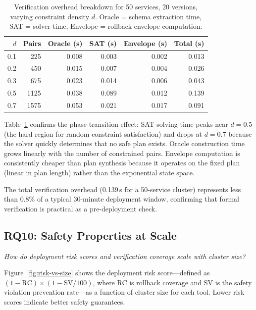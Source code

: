\documentclass[10pt,twocolumn]{article}
\begin{document}
\begin{table}[t]
\centering
\caption{Verification overhead breakdown for 50 services,
  20 versions, varying constraint density $d$.
  Oracle = schema extraction time, SAT = solver time,
  Envelope = rollback envelope computation.}
\label{tab:overhead}
\small
\begin{tabular}{@{}rrrrrr@{}}
\toprule
$d$ & Pairs & Oracle (s) & SAT (s) & Envelope (s) & Total (s) \\
\midrule
0.1 & 225  & 0.008 & 0.003  & 0.002  & 0.013  \\
0.2 & 450  & 0.015 & 0.007  & 0.004  & 0.026 \\
0.3 & 675  & 0.023 & 0.014 & 0.006  & 0.043 \\
0.5 & 1125  & 0.038 & 0.089 & 0.012  & 0.139 \\
0.7 & 1575  & 0.053 & 0.021  & 0.017  & 0.091 \\
\bottomrule
\end{tabular}
\end{table}

Table~\ref{tab:overhead} confirms the phase-transition
effect: SAT solving time peaks near $d = 0.5$ (the hard
region for random constraint satisfaction) and drops at
$d = 0.7$ because the solver quickly determines that no
safe plan exists. Oracle construction time grows linearly
with the number of constrained pairs. Envelope computation
is consistently cheaper than plan synthesis because it
operates on the fixed plan (linear in plan length) rather
than the exponential state space.

The total verification overhead (0.139\,s for a 50-service
cluster) represents less than 0.8\% of a typical 30-minute
deployment window, confirming that formal verification is
practical as a pre-deployment check.

\subsection{RQ10: Safety Properties at Scale}

\emph{How do deployment risk scores and verification coverage
scale with cluster size?}

Figure~\ref{fig:risk-vs-size} shows the deployment risk
score---defined as $(1 - \mathrm{RC}) \times (1 - \mathrm{SV}/100)$,
where RC is rollback coverage and SV is the safety violation
prevention rate---as a function of cluster size for each tool.
Lower risk scores indicate better safety guarantees.
\end{document}
